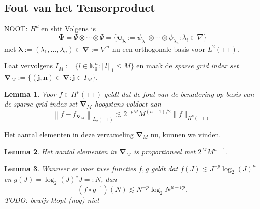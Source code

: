 \documentclass[11pt]{report}
\newcommand{\N}{\mathbb{N}}
\theoremstyle{plain}
\newtheorem*{lemm}{Lemma}
\theoremstyle{remark}
\begin{document}
\subsection{Fout van het Tensorproduct}
NOOT: $H^d$ en shit
Volgens \cite[L3.1.7]{tammo} is 
\[ 
  \boldsymbol\Psi = \Psi \otimes \cdots \otimes \Psi = \{ \boldsymbol{\psi_\lambda} := \psi_{\lambda_1} \otimes \cdots \otimes \psi_{\lambda_n}: \lambda_i \in \nabla \}
\]
met $\boldsymbol\lambda := (\lambda_1, \ldots, \lambda_n) \in \boldsymbol{\nabla} := \nabla^n$ nu een orthogonale basis voor $L^2(\Box)$.

Laat vervolgens $I_M := \{ l \in \N^n_0: ||l||_1 \leq M \}$ en maak de \emph{sparse grid index set} $\boldsymbol{\nabla}_M := \{ \boldsymbol{(j,n)} \in \boldsymbol{\nabla}: \boldsymbol{j} \in I_M \}$.

\begin{lemm}{\cite[P3.2.3]{tammo}}
  Voor $f \in H^p(\Box)$ geldt dat de fout van de benadering op basis van de sparse grid index set $\boldsymbol{\nabla}_M$ hoogstens voldoet aan
\[
  \left\| f - f_{\boldsymbol\nabla_M} \right\|_{L_2(\Box)} \lesssim 2^{-pM} M^{(n-1)/2} \| f \|_{H^p(\Box)}
\]
\end{lemm}

Het aantal elementen in deze verzameling $\boldsymbol{\nabla}_M$ nu, kunnen we vinden.
\begin{lemm}{\cite[L3.3.1]{tammo}}
  Het aantal elementen in $\boldsymbol{\nabla}_M$ is proportioneel met $2^M M^{n-1}$.
\end{lemm}

\begin{lemm}
  Wanneer er voor twee functies $f, g$ geldt dat $f(J) \lesssim J^{-p}\log_2(J)^\mu$ en $g(J) = \log_2(J)^\nu J =: N$, dan
  \[
    (f \circ g^{-1})(N) \lesssim N^{-p} \log_2{N}^{\mu + \nu p}.
  \]
  TODO: bewijs klopt (nog) niet
\end{lemm}

\end{document}

